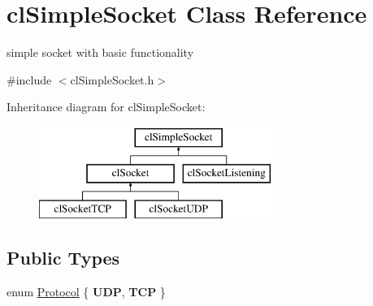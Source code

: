 \hypertarget{classcl_simple_socket}{
\section{clSimpleSocket Class Reference}
\label{classcl_simple_socket}
}


simple socket with basic functionality  




{\ttfamily \#include $<$clSimpleSocket.h$>$}

Inheritance diagram for clSimpleSocket:\begin{figure}[H]
\begin{center}
\leavevmode
\includegraphics[height=3.000000cm]{classcl_simple_socket}
\end{center}
\end{figure}
\subsection*{Public Types}
\begin{DoxyCompactItemize}
\item 
enum \hyperlink{classcl_simple_socket_affcd3d22c1abba5d20a0ae93472c576d}{Protocol} \{ {\bfseries UDP}, 
{\bfseries TCP}
 \}
\end{DoxyCompactItemize}
